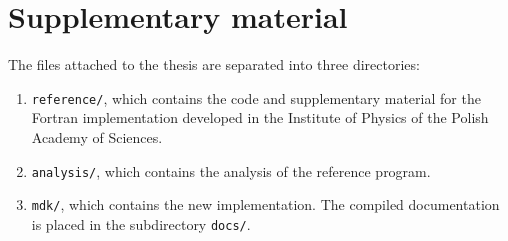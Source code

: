 
\chapter{Supplementary material}\label{c:supplement}

The files attached to the thesis are separated into three directories:

\begin{enumerate}
    \item \texttt{reference/}, which contains the code and supplementary material for the Fortran implementation developed in the Institute of Physics of the Polish Academy of Sciences.
    \item \texttt{analysis/}, which contains the analysis of the reference program.
    \item \texttt{mdk/}, which contains the new implementation. The compiled documentation is placed in the subdirectory \texttt{docs/}.
\end{enumerate}